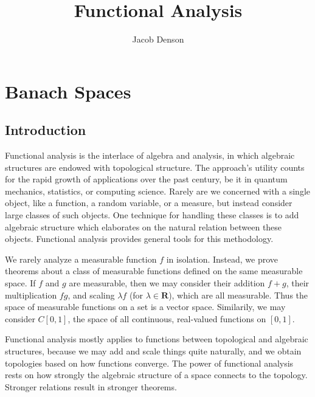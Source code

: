 

\title{Functional Analysis}
\author{Jacob Denson}



\maketitle
\tableofcontents
{}


\part{Banach Spaces}

\chapter{Introduction}

Functional analysis is the interlace of algebra and analysis, in which algebraic structures are endowed with topological structure. The approach's utility counts for the rapid growth of applications over the past century, be it in quantum mechanics, statistics, or computing science. Rarely are we concerned with a single object, like a function, a random variable, or a measure, but instead consider large classes of such objects. One technique for handling these classes is to add algebraic structure which elaborates on the natural relation between these objects. Functional analysis provides general tools for this methodology.

\begin{example}
    We rarely analyze a measurable function $f$ in isolation. Instead, we prove theorems about a class of measurable functions defined on the same measurable space. If $f$ and $g$ are measurable, then we may consider their addition $f + g$, their multiplication $fg$, and scaling $\lambda f$ (for $\lambda \in \mathbf{R}$), which are all measurable. Thus the space of measurable functions on a set is a vector space. Similarily, we may consider $C[0,1]$, the space of all continuous, real-valued functions on $[0,1]$.
\end{example}

Functional analysis mostly applies to functions between topological and algebraic structures, because we may add and scale things quite naturally, and we obtain topologies based on how functions converge. The power of functional analysis rests on how strongly the algebraic structure of a space connects to the topology. Stronger relations result in stronger theorems.

